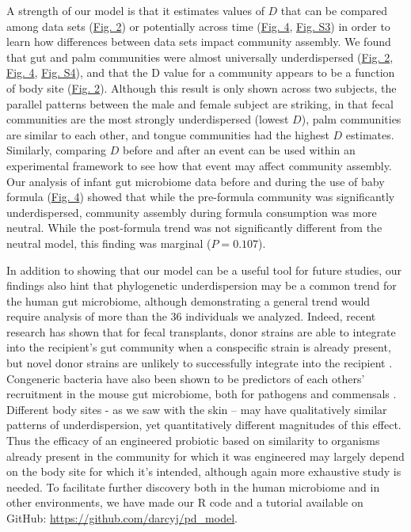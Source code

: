 \documentclass{article}
\begin{document}
A strength of our model is that it estimates values of \(D\) that can be compared among data sets (\hyperref[sec:figure2]{Fig. 2}) or potentially across time (\hyperref[sec:figure4]{Fig. 4}, \hyperref[sec:figureS3]{Fig. S3}) in order to learn how differences between data sets impact community assembly. We found that gut and palm communities were almost universally underdispersed (\hyperref[sec:figure2]{Fig. 2}, \hyperref[sec:figure4]{Fig. 4}, \hyperref[sec:figureS4]{Fig. S4}), and that the D value for a community appears to be a function of body site (\hyperref[sec:figure2]{Fig. 2}). Although this result is only shown across two subjects, the parallel patterns between the male and female subject are striking, in that fecal communities are the most strongly underdispersed (lowest \(D\)), palm communities are similar to each other, and tongue communities had the highest \(D\) estimates. Similarly, comparing \(D\) before and after an event can be used within an experimental framework to see how that event may affect community assembly. Our analysis of infant gut microbiome data \cite{Koenig2011} before and during the use of baby formula (\hyperref[sec:figure4]{Fig. 4}) showed that while the pre-formula community was significantly underdispersed, community assembly during formula consumption was more neutral. While the post-formula trend was not significantly different from the neutral model, this finding was marginal (\(P = 0.107\)). 
\par
In addition to showing that our model can be a useful tool for future studies, our findings also hint that phylogenetic underdispersion may be a common trend for the human gut microbiome, although demonstrating a general trend would require analysis of more than the 36 individuals we analyzed. Indeed, recent research has shown that for fecal transplants, donor strains are able to integrate into the recipient's gut community when a conspecific strain is already present, but novel donor strains are unlikely to successfully integrate into the recipient \cite{Li2016}. Congeneric bacteria have also been shown to be predictors of each others' recruitment in the mouse gut microbiome, both for pathogens and commensals \cite{Stecher2010}. Different body sites - as we saw with the skin – may have qualitatively similar patterns of underdispersion, yet quantitatively different magnitudes of this effect. Thus the efficacy of an engineered probiotic based on similarity to organisms already present in the community for which it was engineered may largely depend on the body site for which it's intended, although again more exhaustive study is needed. To facilitate further discovery both in the human microbiome and in other environments, we have made our R code and a tutorial available on GitHub: \url{https://github.com/darcyj/pd_model}.
\end{document}
